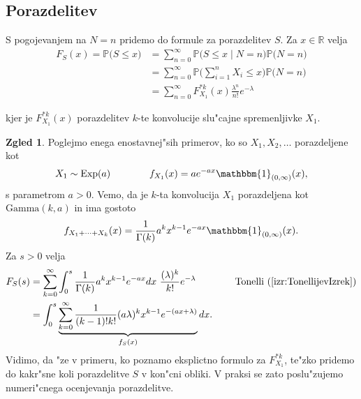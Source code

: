 \documentclass[12pt, a4paper, reqno]{amsart}
\theoremstyle{definition}
\newtheorem{zgled}[definicija]{Zgled}
\theoremstyle{plain}
\newcommand{\R}{\mathbb{R}}
\newcommand{\Prob}{\mathbb{P}}
\newcommand{\1}{\mathds{1}}
\begin{document}
    \subsection{Porazdelitev}
    S pogojevanjem na $N = n$ pridemo do formule za porazdelitev $S$. Za $x \in \R$ velja 
    \begin{align*}
        F_{S}(x) = \Prob\bigl(S \leq x\bigr) 
        &= \sum_{n=0}^\infty \Prob\bigl(S \leq x \mid N = n\bigr)\Prob\bigl(N = n\bigr) \\
        &= \sum_{n=0}^\infty \Prob\biggl(\sum_{i=1}^nX_i \leq x\biggr)\Prob\bigl(N = n\bigr) \\
        &= \sum_{n=0}^\infty F_{X_1}^{*k}(x) \frac{\lambda^n}{n!} e^{-\lambda}
    \end{align*}

    \noindent
    kjer je $F_{X_1}^{*k}(x)$ porazdelitev $k$-te konvolucije slu"cajne spremenljivke $X_1$.
    
    \begin{zgled}
        Poglejmo enega enostavnej"sih primerov, ko so $X_1, X_2, \dots$ porazdeljene kot
        \begin{equation*}
            X_1\sim\text{Exp}(a) \qquad \qquad f_{X_1}(x) = a e^{-a x}\mathbbm{1}_{(0, \infty)}(x),
        \end{equation*}
        s parametrom $a>0$. Vemo, da je $k$-ta 
        konvolucija $X_1$ porazdeljena kot \newline $\text{Gamma}(k, a)$ in ima gostoto
        \begin{equation*}
            f_{X_1 + \cdots + X_k}(x) = \frac{1}{\Gamma(k)}a^kx^{k-1}e^{-a x}\mathbbm{1}_{(0, \infty)}(x).
        \end{equation*}
        Za $s>0$ velja
        \begin{align*}
            F_{S}(s) 
            &= \sum_{k=0}^\infty \int_0^s\frac{1}{\Gamma(k)}a^kx^{k-1}e^{-ax}dx \ \frac{(\lambda )^k}{k!}e^{-\lambda }
            \qquad \qquad \text{Tonelli} \ (\ref{izr:TonellijevIzrek}) \\
            &= \int_0^s\underbrace{\sum_{k=0}^\infty \frac{1}{(k-1)!k!}(a\lambda)^kx^{k-1}e^{-(ax + \lambda)}}_{f_S(x)}dx.
        \end{align*}
        Vidimo, da "ze v primeru, ko poznamo eksplictno formulo za $F^{*k}_{X_1}$, te"zko pridemo do 
        kakr"sne koli porazdelitve $S$ v kon"cni obliki. V praksi se zato poslu"zujemo numeri"cnega 
        ocenjevanja porazdelitve.
        \label{zgd:sestavljenaPoissonovaPorazdelitevGamma}
    \end{zgled}
\end{document}
